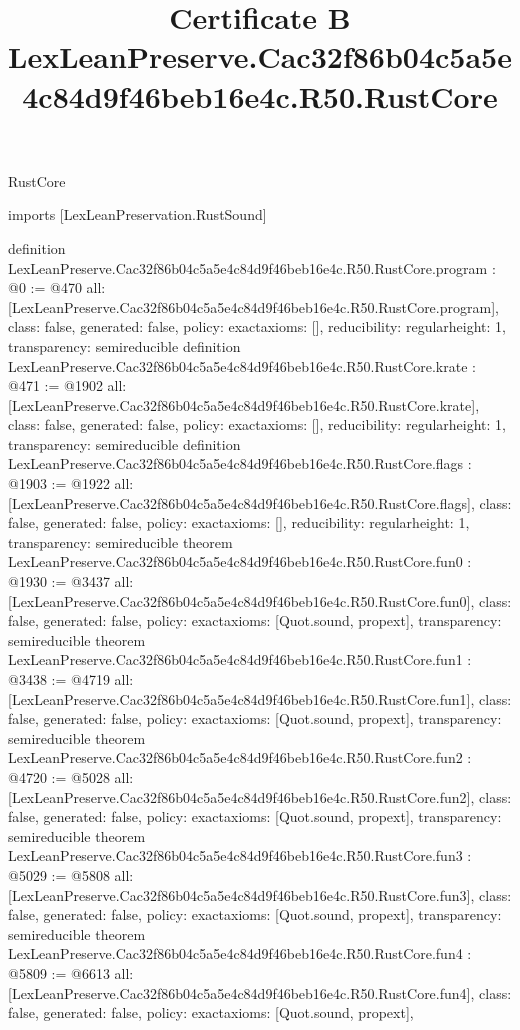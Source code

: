 \begin{lexlean}{RustCore}
\title{Certificate B LexLeanPreserve.Cac32f86b04c5a5e4c84d9f46beb16e4c.R50.RustCore}
\begin{coremodule}
imports [LexLeanPreservation.RustSound]

definition LexLeanPreserve.Cac32f86b04c5a5e4c84d9f46beb16e4c.R50.RustCore.program : @0 := @470 {
  all: [LexLeanPreserve.Cac32f86b04c5a5e4c84d9f46beb16e4c.R50.RustCore.program],
  class: false,
  generated: false,
  policy: exact{axioms: []},
  reducibility: regular{height: 1},
  transparency: semireducible
}
definition LexLeanPreserve.Cac32f86b04c5a5e4c84d9f46beb16e4c.R50.RustCore.krate : @471 := @1902 {
  all: [LexLeanPreserve.Cac32f86b04c5a5e4c84d9f46beb16e4c.R50.RustCore.krate],
  class: false,
  generated: false,
  policy: exact{axioms: []},
  reducibility: regular{height: 1},
  transparency: semireducible
}
definition LexLeanPreserve.Cac32f86b04c5a5e4c84d9f46beb16e4c.R50.RustCore.flags : @1903 := @1922 {
  all: [LexLeanPreserve.Cac32f86b04c5a5e4c84d9f46beb16e4c.R50.RustCore.flags],
  class: false,
  generated: false,
  policy: exact{axioms: []},
  reducibility: regular{height: 1},
  transparency: semireducible
}
theorem LexLeanPreserve.Cac32f86b04c5a5e4c84d9f46beb16e4c.R50.RustCore.fun0 : @1930 := @3437 {
  all: [LexLeanPreserve.Cac32f86b04c5a5e4c84d9f46beb16e4c.R50.RustCore.fun0],
  class: false,
  generated: false,
  policy: exact{axioms: [Quot.sound, propext]},
  transparency: semireducible
}
theorem LexLeanPreserve.Cac32f86b04c5a5e4c84d9f46beb16e4c.R50.RustCore.fun1 : @3438 := @4719 {
  all: [LexLeanPreserve.Cac32f86b04c5a5e4c84d9f46beb16e4c.R50.RustCore.fun1],
  class: false,
  generated: false,
  policy: exact{axioms: [Quot.sound, propext]},
  transparency: semireducible
}
theorem LexLeanPreserve.Cac32f86b04c5a5e4c84d9f46beb16e4c.R50.RustCore.fun2 : @4720 := @5028 {
  all: [LexLeanPreserve.Cac32f86b04c5a5e4c84d9f46beb16e4c.R50.RustCore.fun2],
  class: false,
  generated: false,
  policy: exact{axioms: [Quot.sound, propext]},
  transparency: semireducible
}
theorem LexLeanPreserve.Cac32f86b04c5a5e4c84d9f46beb16e4c.R50.RustCore.fun3 : @5029 := @5808 {
  all: [LexLeanPreserve.Cac32f86b04c5a5e4c84d9f46beb16e4c.R50.RustCore.fun3],
  class: false,
  generated: false,
  policy: exact{axioms: [Quot.sound, propext]},
  transparency: semireducible
}
theorem LexLeanPreserve.Cac32f86b04c5a5e4c84d9f46beb16e4c.R50.RustCore.fun4 : @5809 := @6613 {
  all: [LexLeanPreserve.Cac32f86b04c5a5e4c84d9f46beb16e4c.R50.RustCore.fun4],
  class: false,
  generated: false,
  policy: exact{axioms: [Quot.sound, propext]},
}
\end{coremodule}
\end{lexlean}
